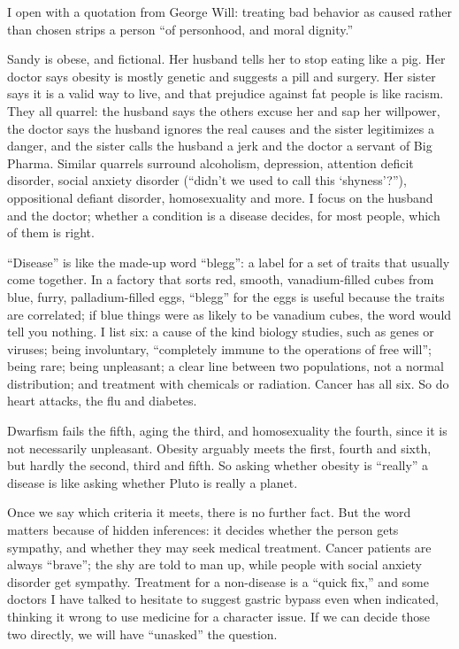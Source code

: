 
I open with a quotation from George Will: treating bad behavior as caused rather than chosen strips a person ``of personhood, and moral dignity.''

Sandy is obese, and fictional. Her husband tells her to stop eating like a pig. Her doctor says obesity is mostly genetic and suggests a pill and surgery. Her sister says it is a valid way to live, and that prejudice against fat people is like racism. They all quarrel: the husband says the others excuse her and sap her willpower, the doctor says the husband ignores the real causes and the sister legitimizes a danger, and the sister calls the husband a jerk and the doctor a servant of Big Pharma. Similar quarrels surround alcoholism, depression, attention deficit disorder, social anxiety disorder (``didn't we used to call this `shyness'?''), oppositional defiant disorder, homosexuality and more. I focus on the husband and the doctor; whether a condition is a disease decides, for most people, which of them is right.

``Disease'' is like the made-up word ``blegg'': a label for a set of traits that usually come together. In a factory that sorts red, smooth, vanadium-filled cubes from blue, furry, palladium-filled eggs, ``blegg'' for the eggs is useful because the traits are correlated; if blue things were as likely to be vanadium cubes, the word would tell you nothing. I list six: a cause of the kind biology studies, such as genes or viruses; being involuntary, ``completely immune to the operations of free will''; being rare; being unpleasant; a clear line between two populations, not a normal distribution; and treatment with chemicals or radiation. Cancer has all six. So do heart attacks, the flu and diabetes. 

Dwarfism fails the fifth, aging the third, and homosexuality the fourth, since it is not necessarily unpleasant. Obesity arguably meets the first, fourth and sixth, but hardly the second, third and fifth. So asking whether obesity is ``really'' a disease is like asking whether Pluto is really a planet.

Once we say which criteria it meets, there is no further fact. But the word matters because of hidden inferences: it decides whether the person gets sympathy, and whether they may seek medical treatment. Cancer patients are always ``brave''; the shy are told to man up, while people with social anxiety disorder get sympathy. Treatment for a non-disease is a ``quick fix,'' and some doctors I have talked to hesitate to suggest gastric bypass even when indicated, thinking it wrong to use medicine for a character issue. If we can decide those two directly, we will have ``unasked'' the question.

